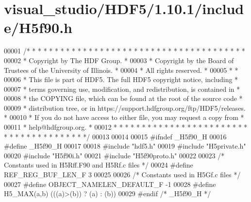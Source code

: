 \hypertarget{visual__studio_2_h_d_f5_21_810_81_2include_2_h5f90_8h_source}{}\section{visual\+\_\+studio/\+H\+D\+F5/1.10.1/include/\+H5f90.h}
\label{visual__studio_2_h_d_f5_21_810_81_2include_2_h5f90_8h_source}

\begin{DoxyCode}
00001 \textcolor{comment}{/* * * * * * * * * * * * * * * * * * * * * * * * * * * * * * * * * * * * * * *}
00002 \textcolor{comment}{ * Copyright by The HDF Group.                                               *}
00003 \textcolor{comment}{ * Copyright by the Board of Trustees of the University of Illinois.         *}
00004 \textcolor{comment}{ * All rights reserved.                                                      *}
00005 \textcolor{comment}{ *                                                                           *}
00006 \textcolor{comment}{ * This file is part of HDF5.  The full HDF5 copyright notice, including     *}
00007 \textcolor{comment}{ * terms governing use, modification, and redistribution, is contained in    *}
00008 \textcolor{comment}{ * the COPYING file, which can be found at the root of the source code       *}
00009 \textcolor{comment}{ * distribution tree, or in https://support.hdfgroup.org/ftp/HDF5/releases.  *}
00010 \textcolor{comment}{ * If you do not have access to either file, you may request a copy from     *}
00011 \textcolor{comment}{ * help@hdfgroup.org.                                                        *}
00012 \textcolor{comment}{ * * * * * * * * * * * * * * * * * * * * * * * * * * * * * * * * * * * * * * */}
00013 
00014 
00015 \textcolor{preprocessor}{#ifndef \_H5f90\_H}
00016 \textcolor{preprocessor}{#define \_H5f90\_H}
00017 
00018 \textcolor{preprocessor}{#include "hdf5.h"}
00019 \textcolor{preprocessor}{#include "H5private.h"}
00020 \textcolor{preprocessor}{#include "H5f90i.h"}
00021 \textcolor{preprocessor}{#include "H5f90proto.h"}
00022 
00023 \textcolor{comment}{/* Constants used in H5Rff.F90 and H5Rf.c files */}
00024 \textcolor{preprocessor}{#define REF\_REG\_BUF\_LEN\_F    3}
00025 
00026 \textcolor{comment}{/* Constants used in H5Gf.c files */}
00027 \textcolor{preprocessor}{#define OBJECT\_NAMELEN\_DEFAULT\_F -1}
00028 \textcolor{preprocessor}{#define H5\_MAX(a,b)            (((a)>(b)) ? (a) : (b))}
00029 \textcolor{preprocessor}{#endif }\textcolor{comment}{/* \_H5f90\_H */}\textcolor{preprocessor}{}
\end{DoxyCode}
